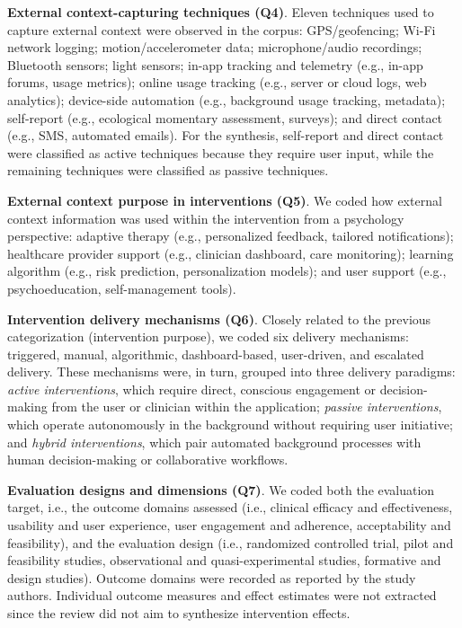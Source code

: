 \textbf{External context-capturing techniques (Q4)}. Eleven techniques used to capture external context were observed in the corpus: GPS/geofencing; Wi-Fi network logging; motion/accelerometer data; microphone/audio recordings; Bluetooth sensors; light sensors; in-app tracking and telemetry (e.g., in-app forums, usage metrics); online usage tracking (e.g., server or cloud logs, web analytics); device-side automation (e.g., background usage tracking, metadata); self-report (e.g., ecological momentary assessment, surveys); and direct contact (e.g., SMS, automated emails). For the synthesis, self-report and direct contact were classified as active techniques because they require user input, while the remaining techniques were classified as passive techniques.

\textbf{External context purpose in interventions (Q5)}. We coded how external context information was used within the intervention from a psychology perspective: adaptive therapy (e.g., personalized feedback, tailored notifications); healthcare provider support (e.g., clinician dashboard, care monitoring); learning algorithm (e.g., risk prediction, personalization models); and user support (e.g., psychoeducation, self-management tools). 

\textbf{Intervention delivery mechanisms (Q6)}. Closely related to the previous categorization (intervention purpose), we coded six delivery mechanisms: triggered, manual, algorithmic, dashboard-based, user-driven, and escalated delivery. These mechanisms were, in turn, grouped into three delivery paradigms: \textit{active interventions}, which require direct, conscious engagement or decision-making from the user or clinician within the application; \textit{passive interventions}, which operate autonomously in the background without requiring user initiative; and \textit{hybrid interventions}, which pair automated background processes with human decision-making or collaborative workflows.

\textbf{Evaluation designs and dimensions (Q7)}. We coded both the evaluation target, i.e., the outcome domains assessed (i.e., clinical efficacy and effectiveness, usability and user experience, user engagement and adherence, acceptability and feasibility), and the evaluation design (i.e., randomized controlled trial, pilot and feasibility studies, observational and quasi-experimental studies, formative and design studies). Outcome domains were recorded as reported by the study authors. Individual outcome measures and effect estimates were not extracted since the review did not aim to synthesize intervention effects.



